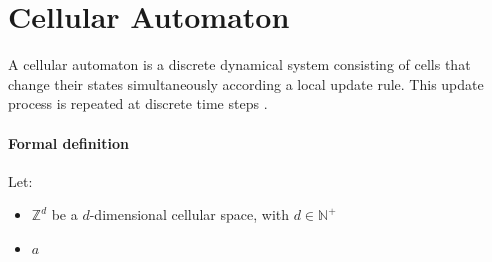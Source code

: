 \section{Cellular Automaton}
\label{ca}

A cellular automaton is a discrete dynamical system consisting of cells that change their states simultaneously according a local update rule. This update process is repeated at discrete time steps \cite{canotes}.

\paragraph{Formal definition}

Let:
\begin{itemize}
	\item $\mathds{Z}^{d}$ be a $d$-dimensional cellular space, with $d \in \mathds{N}^{+}$ 
	\item $a$

\end{itemize}



